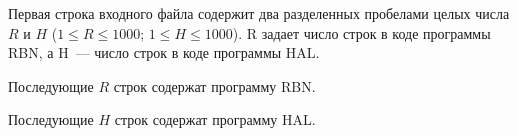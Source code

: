 Первая строка входного файла содержит два разделенных пробелами целых
числа $R$ и $H$ ($1 \leq R \leq 1000$; $1 \leq H \leq 1000$). R задает число строк в коде
программы RBN, а H~--- число строк в коде программы HAL. 

Последующие $R$ строк содержат программу RBN. 

Последующие $H$ строк содержат программу HAL.
